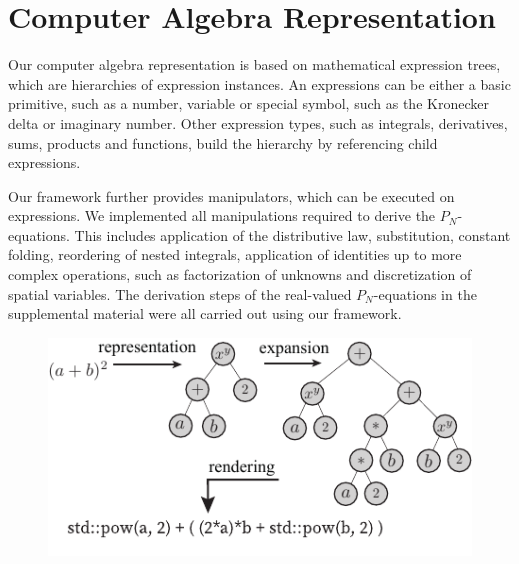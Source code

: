 
\section{Computer Algebra Representation}
\label{sec:car}

Our computer algebra representation is based on mathematical expression trees, which are hierarchies of expression instances. An expressions can be either a basic primitive, such as a number, variable or special symbol, such as the Kronecker delta or imaginary number. Other expression types, such as integrals, derivatives, sums, products and functions, build the hierarchy by referencing child expressions.

Our framework further provides manipulators, which can be executed on expressions. We implemented all manipulations required to derive the $P_N$-equations. This includes application of the distributive law, substitution, constant folding, reordering of nested integrals, application of identities up to more complex operations, such as factorization of unknowns and discretization of spatial variables. The derivation steps of the real-valued $P_N$-equations in the supplemental material were all carried out using our framework.

\begin{figure}[h]
\centering
\includegraphics[width=0.9\columnwidth]{figures/fig_car.pdf}
\vspace{-0.16in}
\label{fig:staggeredgrid}
\end{figure}


